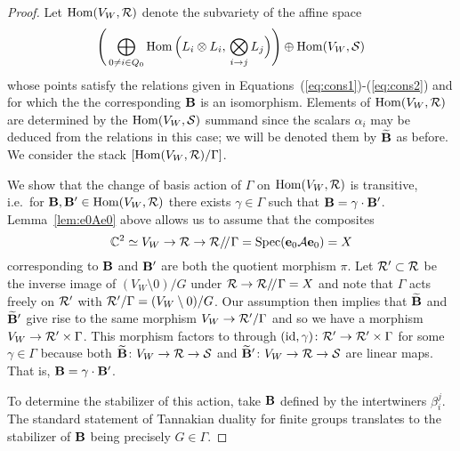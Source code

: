 \documentclass{amsart}
\theoremstyle{definition}
\newcommand\VW{V_W}
\begin{document}
\begin{proof}
Let $\Hom(\VW, \cR)$ denote the subvariety of the affine space $$\Bigg(\bigoplus_{0\neq i \in Q_0} \Hom\Big(L_i \otimes L_i,\, \bigotimes_{i \rightarrow j} L_j\Big) \Bigg) \oplus \Hom(\VW,\cS)$$ whose points satisfy the relations given in Equations~(\ref{eq:cons1})-(\ref{eq:cons2}) and for which the the corresponding $\mathbf{B}$ is an isomorphism.
Elements of $\Hom(\VW, \cR)$ are determined by the $\Hom(\VW,\cS)$ summand since the scalars $\alpha_i$ may be deduced from the relations in this case; we will be denoted them by $\widetilde{\mathbf{B}}$ as before.
We consider the stack $[\Hom(\VW,\cR)/\Gamma]$.

We show that the change of basis action of $\Gamma$ on $\Hom(\VW,\cR)$ is transitive, i.e.\  for $\bfB, \bfB' \in \Hom(\VW,\cR)$ there exists $\gamma \in \Gamma$ such that $\mathbf{B} = \gamma \cdot \mathbf{B}'$.
Lemma~\ref{lem:e0Ae0} above allows us to assume that the composites  
$$\bC^2 \simeq \VW \rightarrow \cR \rightarrow \cR \GIT \Gamma = \Spec(\bfe_0 \cA \bfe_0) = X$$
corresponding to $\mathbf{B}$ and $\mathbf{B}'$ are both the quotient morphism $\pi$.
Let $\mathcal{R}' \subset \mathcal{R}$ be the inverse image of $(\VW \setminus 0) / G$ under  $\mathcal{R} \rightarrow \mathcal{R} / \! /_{} \Gamma = X$ and note that $\Gamma$ acts freely on $\mathcal{R}'$ with $\cR' / \Gamma = (\VW \setminus 0) / G$.
Our assumption then implies that $\widetilde{\mathbf{B}}$ and $\widetilde{\mathbf{B}}'$ give rise to the same morphism $\VW \rightarrow \cR'/\Gamma$ and so we have a morphism $\VW \rightarrow \cR' \times \Gamma$.
This morphism factors to through $(\operatorname{id}, \gamma) \colon \mathcal{R}' \rightarrow \mathcal{R}' \times \Gamma$ for some $\gamma \in \Gamma$ because both $\widetilde{\bfB} \colon \VW \rightarrow \cR \rightarrow \cS$ and $\widetilde{\bfB}' \colon \VW \rightarrow \cR \rightarrow \cS$ are linear maps.
That is, $\mathbf{B} = \gamma \cdot \mathbf{B}'$.

To determine the stabilizer of this action, take $\mathbf{B}$ defined by the intertwiners $\beta_i^j$.
The standard statement of Tannakian duality for finite groups translates to the stabilizer of $\mathbf{B}$ being precisely $G \in \Gamma$.


\end{proof}
\end{document}
